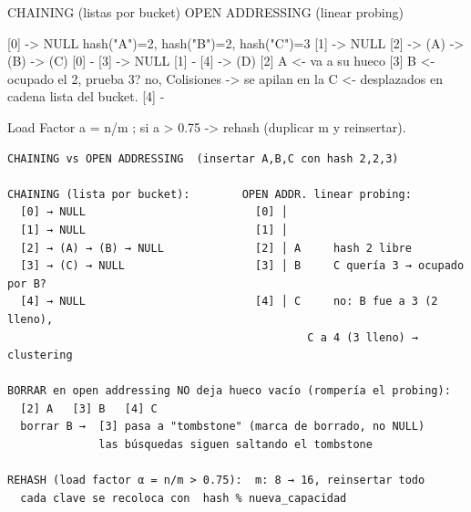 \begin{dsadiagrama}
CHAINING (listas por bucket)      OPEN ADDRESSING (linear probing)

 [0] -> NULL                       hash("A")=2, hash("B")=2, hash("C")=3
 [1] -> NULL
 [2] -> (A) -> (B) -> (C)          [0] -
 [3] -> NULL                       [1] -
 [4] -> (D)                        [2] A     <- va a su hueco
                                   [3] B     <- ocupado el 2, prueba 3? no,
 Colisiones -> se apilan en la         C     <- desplazados en cadena
 lista del bucket.                 [4] -

 Load Factor a = n/m ; si a > 0.75 -> rehash (duplicar m y reinsertar).
\end{dsadiagrama}

\begin{dsacomofunciona}
\begin{verbatim}
CHAINING vs OPEN ADDRESSING  (insertar A,B,C con hash 2,2,3)

CHAINING (lista por bucket):        OPEN ADDR. linear probing:
  [0] → NULL                          [0] │
  [1] → NULL                          [1] │
  [2] → (A) → (B) → NULL              [2] │ A     hash 2 libre
  [3] → (C) → NULL                    [3] │ B     C quería 3 → ocupado por B?
  [4] → NULL                          [4] │ C     no: B fue a 3 (2 lleno),
                                              C a 4 (3 lleno) → clustering

BORRAR en open addressing NO deja hueco vacío (rompería el probing):
  [2] A   [3] B   [4] C
  borrar B →  [3] pasa a "tombstone" (marca de borrado, no NULL)
              las búsquedas siguen saltando el tombstone

REHASH (load factor α = n/m > 0.75):  m: 8 → 16, reinsertar todo
  cada clave se recoloca con  hash % nueva_capacidad
\end{verbatim}
\end{dsacomofunciona}

